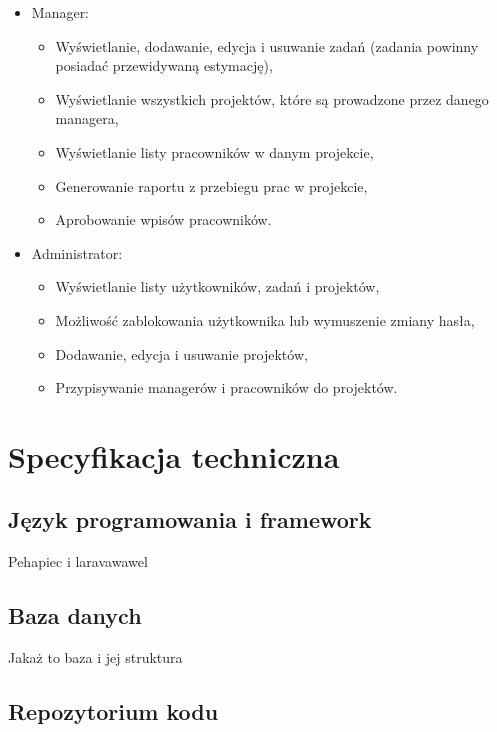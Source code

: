 \documentclass[a4paper, 12pt, oneside]{article}
\begin{document}
\begin{itemize}
\begin{itemize}
			\end{itemize}
			
			\item Manager:
			
			\begin{itemize}
			
			\item Wyświetlanie, dodawanie, edycja i usuwanie zadań (zadania powinny posiadać przewidywaną estymację),
\item Wyświetlanie wszystkich projektów, które są prowadzone przez danego managera,
\item Wyświetlanie listy pracowników w danym projekcie,
\item Generowanie raportu z przebiegu prac w projekcie,
\item Aprobowanie wpisów pracowników.
			
			\end{itemize}
			
			\item Administrator:
			
			\begin{itemize}
			
			\item Wyświetlanie listy użytkowników, zadań i projektów,
\item Możliwość zablokowania użytkownika lub wymuszenie zmiany hasła,
\item Dodawanie, edycja i usuwanie projektów,
\item Przypisywanie managerów i pracowników do projektów.
			
			\end{itemize}
			
			
			
		\end{itemize}
		
	\section{Specyfikacja techniczna}
		\subsection{Język programowania i framework}
			Pehapiec i laravawawel
		\subsection{Baza danych}
			Jakaż to baza i jej struktura
		\subsection{Repozytorium kodu}
\end{document}
